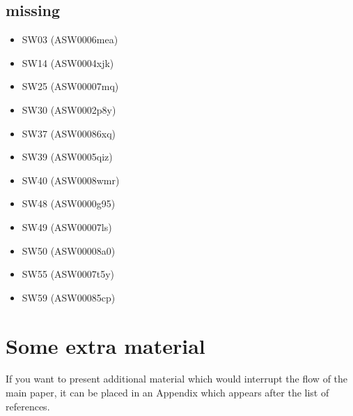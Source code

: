 \documentclass[a4paper,fleqn,usenatbib]{mnras}
\begin{document}
\subsection{missing}
\begin{itemize}
  \item SW03 (ASW0006mea)
  \item SW14 (ASW0004xjk)
  \item SW25 (ASW00007mq)
  \item SW30 (ASW0002p8y)
  \item SW37 (ASW00086xq)
  \item SW39 (ASW0005qiz)
  \item SW40 (ASW0008wmr)
  \item SW48 (ASW0000g95)
  \item SW49 (ASW00007ls)
  \item SW50 (ASW00008a0)
  \item SW55 (ASW0007t5y)
  \item SW59 (ASW00085cp)
\end{itemize}










\appendix

\section{Some extra material}

If you want to present additional material which would interrupt the flow of the main paper,
it can be placed in an Appendix which appears after the list of references.




\bsp	%
\label{lastpage}
\end{document}
